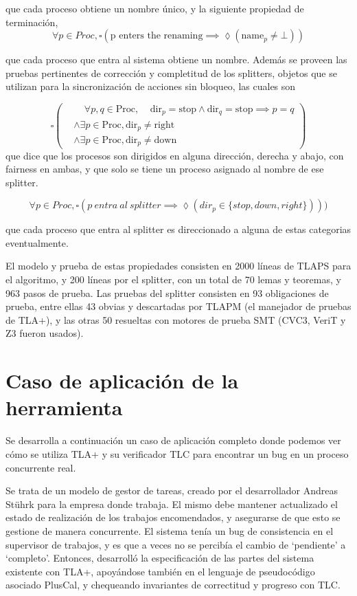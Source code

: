 \documentclass[runningheads]{llncs}
\begin{document}
que cada proceso obtiene un nombre único, y la siguiente propiedad de terminación,
\begin{equation}
    \forall p \in Proc, \square(\text{p enters the renaming} \implies \lozenge (\text{name}_p \neq \bot))
\end{equation}

que cada proceso que entra al sistema obtiene un nombre.
Además se proveen las pruebas pertinentes de corrección y completitud de los splitters, objetos que se utilizan para la sincronización de acciones sin bloqueo,  las cuales son

\[
\square \left( \begin{aligned}
    &\phantom{\land} \forall p,q \in \text{Proc}, \phantom{\land} \text{dir}_p = \text{stop} \land \text{dir}_q = \text{stop} \implies p = q \\
    &\land \exists p \in \text{Proc}, \text{dir}_p \neq \text{right} \\
    &\land \exists p \in \text{Proc}, \text{dir}_p \neq \text{down}
\end{aligned} \right)
\]
que dice que los procesos son dirigidos en alguna dirección, derecha y abajo, con fairness en ambas, y que solo se tiene un proceso asignado al nombre de ese splitter.

\[
    \forall p \in Proc, \square(p\ entra\ al\ splitter \implies \lozenge(dir_p \in \{stop, down, right\})))    
\]

que cada proceso que entra al splitter es direccionado a alguna de estas categorias eventualmente.

El modelo y prueba de estas propiedades consisten en 2000 líneas de TLAPS para el algoritmo, y 200 líneas por el splitter, con un total de 70 lemas y teoremas, y 963 pasos de prueba. Las pruebas del splitter consisten en 93 obligaciones de prueba, entre ellas 43 obvias y descartadas por TLAPM (el manejador de pruebas de TLA+), y las otras 50 resueltas con motores de prueba SMT (CVC3, VeriT y Z3 fueron usados).

\section{Caso de aplicación de la herramienta}
Se desarrolla a continuación un caso de aplicación completo donde podemos ver cómo se utiliza TLA+ y su verificador TLC para encontrar un bug en un proceso concurrente real.

Se trata de un modelo de gestor de tareas, creado por el desarrollador Andreas Stührk para la empresa donde trabaja. El mismo debe mantener actualizado el estado de realización de los trabajos encomendados, y asegurarse de que esto se gestione de manera concurrente. El sistema tenía un bug de consistencia en el supervisor de trabajos, y es que a veces no se percibía el cambio de ‘pendiente’ a ‘completo’. Entonces, desarrolló la especificación de las partes del sistema existente con TLA+, apoyándose también en el lenguaje de pseudocódigo asociado PlusCal, y chequeando invariantes de correctitud y progreso con TLC.
\end{document}
